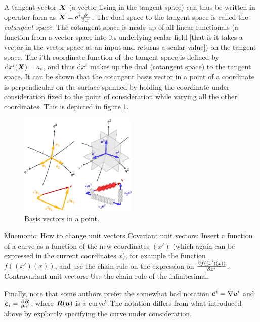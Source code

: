 \documentclass[a4paper, 12pt]{article}
\begin{document}
A tangent vector $\boldsymbol{X}$ (a vector living in the tangent space) can thus be 
written in operator form as $\boldsymbol{X}=a^i\frac{\partial {}}{\partial{x^{i}}}$. The dual space to 
the tangent space is called the \emph{cotangent space}. The cotangent space is 
made up of all linear functionals (a function from a vector space into its 
underlying scalar field [that is it takes a vector in the vector space as an 
input and returns a scalar value]) on the tangent space. The i'th coordinate 
function of the tangent space is defined by $\text{d} x^i(\boldsymbol{X}) = a_i$, and thus $\text{d} 
x^i$ makes up the dual (cotangent space) to the tangent space. It can be shown 
that the cotangent basis vector in a point of a coordinate is perpendicular on 
the surface spanned by holding the coordinate under consideration fixed to the 
point of consideration while varying all the other coordinates. This is 
depicted 
in figure \ref{fig:basis}.
%
\begin{figure}[h!]
\center
 \includegraphics[width=0.5\textwidth]{figures/co-contra}
 \caption{Basis vectors in a point.}
 \label{fig:basis}
\end{figure}

\vspace{0.5cm}
\begin{greenbox}{Mnemonic: How to change unit vectors}
 Covariant unit vectors: Insert a function of a curve as a function of the new 
 coordinates $(x')$ (which again can be expressed in the current coordinates 
 $x$), for example the function $f((x')(x))$, and use the chain rule on the 
 expression on $\frac{\partial {f((x')(x))}}{\partial{x^i}}$.\\
 Contravariant unit vectors: Use the chain rule of the infinitesimal.
\end{greenbox}
%
Finally, note that some authors prefer the somewhat bad notation $\boldsymbol{e}^i = 
\nabla u^i$ and $\boldsymbol{e}_i = \frac{\partial {\boldsymbol{R}}}{\partial{u^i}}$, where $\boldsymbol{R}(\boldsymbol{u})$ is a 
curve\hyperref[note:curve]{$^9$}.The notation differs from what introduced 
above by explicitly specifying the curve under consideration.
\end{document}
